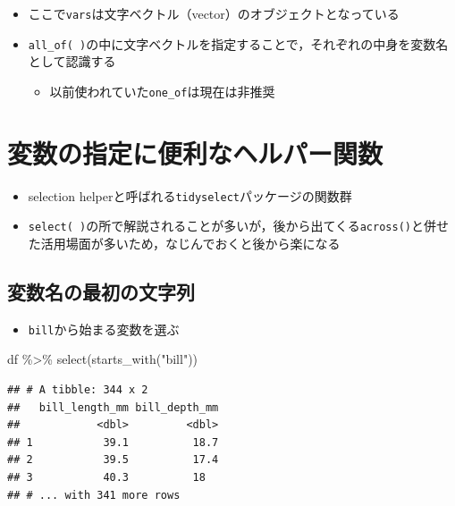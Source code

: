 \documentclass[
  xelatex,ja=standard, b5paper]{bxjsbook}
\newenvironment{Shaded}{\begin{snugshade}}{\end{snugshade}}
\newcommand{\FunctionTok}[1]{\textcolor[rgb]{0.00,0.00,0.00}{#1}}
\newcommand{\NormalTok}[1]{#1}
\newcommand{\SpecialCharTok}[1]{\textcolor[rgb]{0.00,0.00,0.00}{#1}}
\newcommand{\StringTok}[1]{\textcolor[rgb]{0.31,0.60,0.02}{#1}}
\providecommand{\tightlist}{%
  \setlength{\itemsep}{0pt}\setlength{\parskip}{0pt}}
\begin{document}
\begin{itemize}
\tightlist
\item
  ここで\texttt{vars}は文字ベクトル（vector）のオブジェクトとなっている
\item
  \texttt{all\_of(\ )}の中に文字ベクトルを指定することで，それぞれの中身を変数名として認識する

  \begin{itemize}
  \tightlist
  \item
    以前使われていた\texttt{one\_of}は現在は非推奨
  \end{itemize}
\end{itemize}

\hypertarget{select-helper}{%
\section{変数の指定に便利なヘルパー関数}\label{select-helper}}

\begin{itemize}
\tightlist
\item
  selection helperと呼ばれる\texttt{tidyselect}パッケージの関数群
\item
  \texttt{select(\ )}の所で解説されることが多いが，後から出てくる\texttt{across()}と併せた活用場面が多いため，なじんでおくと後から楽になる
\end{itemize}

\hypertarget{select-helper1}{%
\subsection{変数名の最初の文字列}\label{select-helper1}}

\begin{itemize}
\tightlist
\item
  \texttt{bill}から始まる変数を選ぶ
\end{itemize}

\begin{Shaded}
\begin{Highlighting}[]
\NormalTok{df }\SpecialCharTok{\%\textgreater{}\%}
  \FunctionTok{select}\NormalTok{(}\FunctionTok{starts\_with}\NormalTok{(}\StringTok{"bill"}\NormalTok{))}
\end{Highlighting}
\end{Shaded}

\begin{verbatim}
## # A tibble: 344 x 2
##   bill_length_mm bill_depth_mm
##            <dbl>         <dbl>
## 1           39.1          18.7
## 2           39.5          17.4
## 3           40.3          18  
## # ... with 341 more rows
\end{verbatim}
\end{document}

